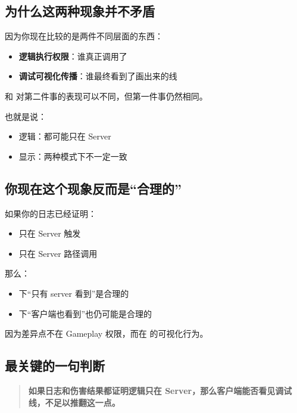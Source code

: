 \subsection{为什么这两种现象并不矛盾}

因为你现在比较的是两件不同层面的东西：

\begin{itemize}
	\item \textbf{逻辑执行权限}：谁真正调用了 
	\item \textbf{调试可视化传播}：谁最终看到了画出来的线
\end{itemize}

 和  对第二件事的表现可以不同，但第一件事仍然相同。

也就是说：

\begin{itemize}
	\item 逻辑：都可能只在 Server
	\item 显示：两种模式下不一定一致
\end{itemize}

\subsection{你现在这个现象反而是“合理的”}

如果你的日志已经证明：

\begin{itemize}
	\item {} 只在 Server 触发
	\item {} 只在 Server 路径调用
\end{itemize}

那么：

\begin{itemize}
	\item {} 下“只有 server 看到”是合理的
	\item {} 下“客户端也看到”也仍可能是合理的
\end{itemize}

因为差异点不在 Gameplay 权限，而在  的可视化行为。

\subsection{最关键的一句判断}

\begin{quote}
	\textbf{如果日志和伤害结果都证明逻辑只在 Server，那么客户端能否看见调试线，不足以推翻这一点。}
\end{quote}

